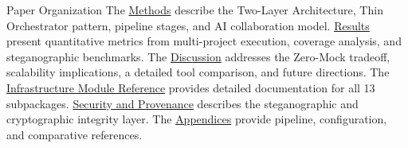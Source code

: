 \documentclass[
  ignorenonframetext,
]{beamer}
\begin{document}
\begin{frame}{Paper Organization}
\protect{}\label{paper-organization}
The \href{03a_architecture.md\#methods}{Methods} describe the Two-Layer
Architecture, Thin Orchestrator pattern, pipeline stages, and AI
collaboration model. \href{04_results.md\#results}{Results} present
quantitative metrics from multi-project execution, coverage analysis,
and steganographic benchmarks. The
\href{05a_zeromock_tradeoff.md\#the-zero-mock-tradeoff}{Discussion}
addresses the Zero-Mock tradeoff, scalability implications, a detailed
tool comparison, and future directions. The
\href{06_infrastructure_modules.md\#infrastructure-module-reference}{Infrastructure
Module Reference} provides detailed documentation for all 13
subpackages.
\href{07_security_provenance.md\#security-and-provenance}{Security and
Provenance} describes the steganographic and cryptographic integrity
layer. The
\href{08a_appendix_pipeline.md\#appendix-pipeline}{Appendices} provide
pipeline, configuration, and comparative references.
\end{frame}
\end{document}
